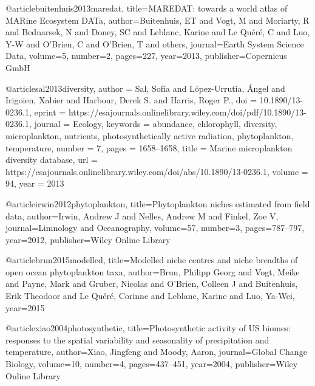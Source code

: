 










@article{buitenhuis2013maredat,
  title={MAREDAT: towards a world atlas of MARine Ecosystem DATa},
  author={Buitenhuis, ET and Vogt, M and Moriarty, R and Bednarsek, N and Doney, SC and Leblanc, Karine and Le Qu{\'e}r{\'e}, C and Luo, Y-W and O'Brien, C and O'Brien, T and others},
  journal={Earth System Science Data},
  volume={5},
  number={2},
  pages={227},
  year={2013},
  publisher={Copernicus GmbH}
}


@article{sal2013diversity,
	author = {Sal, Sofía and López-Urrutia, Ángel and Irigoien, Xabier and Harbour, Derek S. and Harris, Roger P.},
	doi = {10.1890/13-0236.1},
	eprint = {https://esajournals.onlinelibrary.wiley.com/doi/pdf/10.1890/13-0236.1},
	journal = {Ecology},
	keywords = {abundance, chlorophyll, diversity, microplankton, nutrients, photosynthetically active radiation, phytoplankton, temperature},
	number = {7},
	pages = {1658–1658},
	title = {Marine microplankton diversity database},
	url = {https://esajournals.onlinelibrary.wiley.com/doi/abs/10.1890/13-0236.1},
	volume = {94},
	year = {2013}
}


@article{irwin2012phytoplankton,
  title={Phytoplankton niches estimated from field data},
  author={Irwin, Andrew J and Nelles, Andrew M and Finkel, Zoe V},
  journal={Limnology and Oceanography},
  volume={57},
  number={3},
  pages={787--797},
  year={2012},
  publisher={Wiley Online Library}
}

@article{brun2015modelled,
  title={Modelled niche centres and niche breadths of open ocean phytoplankton taxa},
  author={Brun, Philipp Georg and Vogt, Meike and Payne, Mark and Gruber, Nicolas and O'Brien, Colleen J and Buitenhuis, Erik Theodoor and Le Qu{\'e}r{\'e}, Corinne and Leblanc, Karine and Luo, Ya-Wei},
  year={2015}
}

@article{xiao2004photosynthetic,
  title={Photosynthetic activity of US biomes: responses to the spatial variability and seasonality of precipitation and temperature},
  author={Xiao, Jingfeng and Moody, Aaron},
  journal={Global Change Biology},
  volume={10},
  number={4},
  pages={437--451},
  year={2004},
  publisher={Wiley Online Library}
}

